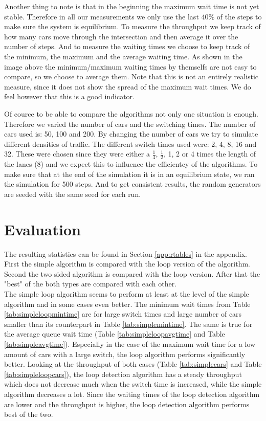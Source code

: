 \documentclass[a4paper,11pt]{article}
\begin{document}
Another thing to note is that in the beginning the maximum wait time is not yet stable.
Therefore in all our measurements we only use the last $40\%$ of the steps to make sure the system is equilibrium.
To measure the throughput we keep track of how many cars move through the intersection and then average it over the number of steps.
And to measure the waiting times we choose to keep track of the minimum, the maximum and the average waiting time.
As shown in the image above the minimum/maximum waiting times by themselfs are not easy to compare, so we choose to average them.
Note that this is not an entirely realistic measure, since it does not show the spread of the maximum wait times.
We do feel however that this is a good indicator.


Of cource to be able to compare the algorithms not only one situation is enough.
Therefore we varied the number of cars and the switching times.
The number of cars used is: 50, 100 and 200.
By changing the number of cars we try to simulate different densities of traffic.
The different switch times used were: 2, 4, 8, 16 and 32.
These were chosen since they were either a $\frac{1}{4}$, $\frac{1}{2}$, 1, 2 or 4 times the length of the lanes (8) and we expect this to influence the efficientcy of the algorithms.
To make sure that at the end of the simulation it is in an equilibrium state, we ran the simulation for 500 steps.
And to get consistent results, the random generators are seeded with the same seed for each run.

\section{Evaluation}\label{sec:eval}

The resulting statistics can be found in Section \ref{app:rtables} in the appendix.
First the simple algorithm is compared with the loop version of the algorithm.
Second the two sided algorithm is compared with the loop version.
After that the "best" of the both types are compared with each other.\\

\noindent The simple loop algorithm seems to perform at least at the level of the simple algorithm
and in some cases even better. The minimum wait times from Table \ref{tab:simpleloopmintime} are for large switch times and large number of cars smaller
than its counterpart in Table \ref{tab:simplemintime}. The same is true for the average queue wait time (Table \ref{tab:simpleloopavgtime} and Table \ref{tab:simpleavgtime}).
Especially in the case of the maximum wait time for a low amount of cars with a large switch, the loop algorithm performs significantly better.
Looking at the throughput of both cases (Table \ref{tab:simplecars} and Table \ref{tab:simpleloopcars}), the loop detection algorithm has 
a steady throughput which does not decrease much when the switch time is increased, while the simple algorithm decreases a lot.
Since the waiting times of the loop detection algorithm are lower and the throughput is higher, the loop detection algorithm performs best of the two.\\
\end{document}
